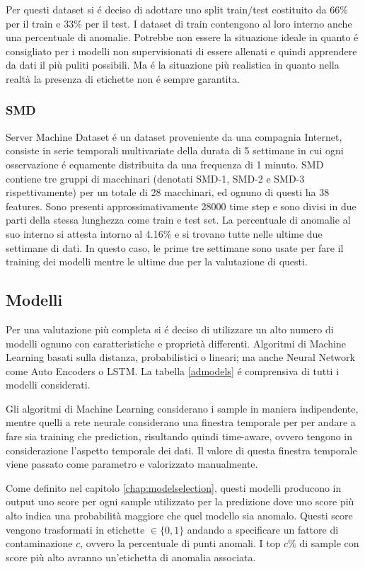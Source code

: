 Per questi dataset si é deciso di adottare uno split train/test costituito da 66\% per il train e 33\% per il test. I dataset di train contengono al loro interno anche una percentuale di anomalie. Potrebbe non essere la situazione ideale in quanto é consigliato per i modelli non supervisionati di essere allenati e quindi apprendere da dati il più puliti possibili. Ma é la situazione più realistica in quanto nella realtà la presenza di etichette non é sempre garantita.  

\subsubsection{SMD}
Server Machine Dataset é un dataset proveniente da una compagnia Internet, consiste in serie temporali multivariate della durata di 5 settimane in cui ogni osservazione é equamente distribuita da una frequenza di 1 minuto. SMD contiene tre gruppi di macchinari (denotati SMD-1, SMD-2 e SMD-3 rispettivamente) per un totale di 28 macchinari, ed ognuno di questi ha 38 features. Sono presenti approssimativamente 28000 time step e sono divisi in due parti della stessa lunghezza come train e test set. 
La percentuale di anomalie al suo interno si attesta intorno al 4.16\% e si trovano tutte nelle ultime due settimane di dati. In questo caso, le prime tre settimane sono usate per fare il training dei modelli mentre le ultime due per la valutazione di questi.



\subsection{Modelli}
Per una valutazione più completa si é deciso di utilizzare un alto numero di modelli ognuno con caratteristiche e proprietà differenti. Algoritmi di Machine Learning basati sulla distanza, probabilistici o lineari; ma anche Neural Network come Auto Encoders o LSTM. La tabella \ref{admodels} é comprensiva di tutti i modelli considerati.

Gli algoritmi di Machine Learning considerano i sample in maniera indipendente, mentre quelli a rete neurale considerano una finestra temporale per per andare a fare sia training che prediction, risultando quindi time-aware, ovvero tengono in considerazione l'aspetto temporale dei dati. Il valore di questa finestra temporale viene passato come parametro e valorizzato manualmente.

Come definito nel capitolo \ref{chap:modelselection}, questi modelli producono in output uno score per ogni sample utilizzato per la predizione dove uno score più alto indica una probabilità maggiore che quel modello sia anomalo. Questi score vengono trasformati in etichette \(\in \{0,1\}\) andando a specificare un fattore di contaminazione $c$, ovvero la percentuale di punti anomali. I top $c\%$ di sample con score più alto avranno un'etichetta di anomalia associata. 

